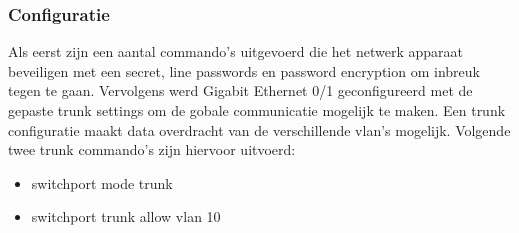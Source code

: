 \subsubsection{Configuratie}
\label{sec:config}
Als eerst zijn een aantal commando's uitgevoerd die het netwerk apparaat beveiligen met een secret, line passwords en password encryption om inbreuk tegen te gaan. Vervolgens werd Gigabit Ethernet 0/1 geconfigureerd met de gepaste trunk settings om de gobale communicatie mogelijk te maken. Een trunk configuratie maakt data overdracht van de verschillende vlan's mogelijk. Volgende twee trunk commando's zijn hiervoor uitvoerd: 

\begin{itemize}
	\item switchport mode trunk
	\item switchport trunk allow vlan 10 
\end{itemize}

